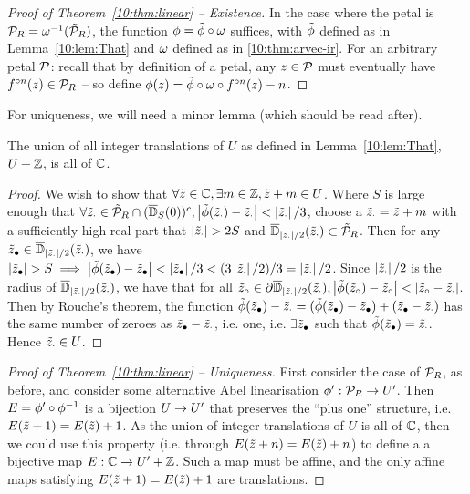 \documentclass[../main.tex]{subfiles}
\begin{document}
\begin{proof}[Proof of Theorem~\ref{10:thm:linear} -- Existence]
    In the case where the petal is $\mathcal{P}_R = {\omega}^{-1}(\tilde{\mathcal{P}}_R)$, the function $\phi=\tilde{\phi}\circ\omega$ suffices, with $\tilde{\phi}$ defined as in Lemma~\ref{10:lem:That} and $\omega$ defined as in \ref{10:thm:arvec-ir}. For an arbitrary petal $\mathcal{P}$: recall that by definition of a petal, any $z\in\mathcal{P}$ must eventually have $f^{\circ n}(z)\in\mathcal{P}_R$ -- so define $\phi(z)=\tilde{\phi}\circ\omega\circ f^{\circ n}(z) - n$.
\end{proof}

For uniqueness, we will need a minor lemma (which should be read after).

\begin{lem}
    \label{10:lem:strip}
    The union of all integer translations of $U$ as defined in Lemma~\ref{10:lem:That}, $U+\mathbb{Z}$, is all of $\mathbb{C}$. 
\end{lem}
\begin{proof}
    We wish to show that $\forall \tilde{z}\in\mathbb{C}, \exists m\in\mathbb{Z}, \tilde{z}+m\in U$. Where $S$ is large enough that $\forall \tilde{z}_\cdot\in\tilde{\mathcal{P}}_R\cap(\overline{\mathbb{D}}_S(0))^c, \left|\tilde{\phi}(\tilde{z}_\cdot)-\tilde{z}_\cdot\right|<\left|\tilde{z}_\cdot\right|/3$, choose a $\tilde{z}_\cdot=\tilde{z}+m$ with a sufficiently high real part that $\abs{\Tr{z}_\cdot}>2S$ and $\overline{\mathbb{D}}_{\left|\tilde{z}_\cdot\right|/2}(\tilde{z}_\cdot)\subset \tilde{\mathcal{P}}_R$. Then for any $\tilde{z}_{\bullet}\in\overline{\mathbb{D}}_{\left|\tilde{z}_\cdot\right|/2}(\tilde{z}_\cdot)$, we have $\abs{\Tr{z}_{\bullet}}>S\implies \abs{\Tr{\linT}(\Tr{z}_{\bullet})-\Tr{z}_{\bullet}}<\abs{\Tr{z}_{\bullet}}/3<(3\abs{\Tr{z}_\cdot}/2)/3=\abs{\Tr{z}_\cdot}/2$. Since $\left|\tilde{z}_\cdot\right|/2$ is the radius of $\overline{\mathbb{D}}_{\left|\tilde{z}_\cdot\right|/2}(\tilde{z}_\cdot)$, we have that for all $\tilde{z}_{\circ}\in\partial\overline{\mathbb{D}}_{\left|\tilde{z}_\cdot\right|/2}(\tilde{z}_\cdot), \left|\tilde{\phi}(\tilde{z}_{\circ})-\tilde{z}_{\circ}\right| < \left|\tilde{z}_{\circ}-\tilde{z}_\cdot\right|$. Then by Rouche's theorem, the function $\tilde{\phi}(\tilde{z}_\bullet)-\tilde{z}_\cdot=(\tilde{\phi}(\tilde{z}_\bullet)-\tilde{z}_\bullet)+(\tilde{z}_\bullet-\tilde{z}_\cdot)$ has the same number of zeroes as $\tilde{z}_\bullet-\tilde{z}_\cdot$, i.e. one, i.e. $\exists \tilde{z}_\bullet$ such that $\tilde{\phi}(\tilde{z}_\bullet)=\tilde{z}_\cdot$. Hence $\tilde{z}_\cdot\in U$.
\end{proof}

\begin{proof}[Proof of Theorem~\ref{10:thm:linear} -- Uniqueness]
    First consider the case of $\mathcal{P}_R$, as before, and consider some alternative Abel linearisation $\phi^{\prime}: \mathcal{P}_R\to U^{\prime}$. Then $E=\phi^{\prime}\circ {\phi}^{-1}$ is a bijection $U\to U^{\prime}$ that preserves the ``plus one'' structure, i.e. $E(\tilde{z}+1)=E(\tilde{z})+1$. As the union of integer translations of $U$ is all of $\mathbb{C}$, then we could use this property (i.e. through $E(\tilde{z}+n)=E(\tilde{z})+n$) to define a a bijective map $E:\mathbb{C}\to U^{\prime}+\mathbb{Z}$. Such a map must be affine, and the only affine maps satisfying $E(\tilde{z}+1)=E(\tilde{z})+1$ are translations.
\end{proof}
\end{document}
